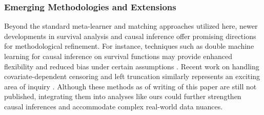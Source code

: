 \subsubsection{Emerging Methodologies and Extensions}
\label{ch03:apd:in_context_of_new_research}
Beyond the standard meta-learner and matching approaches utilized here, newer developments in survival analysis and causal inference offer promising directions for methodological refinement.
For instance, techniques such as double machine learning for causal inference on survival functions may provide enhanced flexibility and reduced bias under certain assumptions \citep{kabata4875226double}.
Recent work on handling covariate-dependent censoring and left truncation similarly represents an exciting area of inquiry \citep{wang2024learning}.
Although these methods as of writing of this paper are still not published, integrating them into analyses like ours could further strengthen causal inferences and accommodate complex real-world data nuances.




